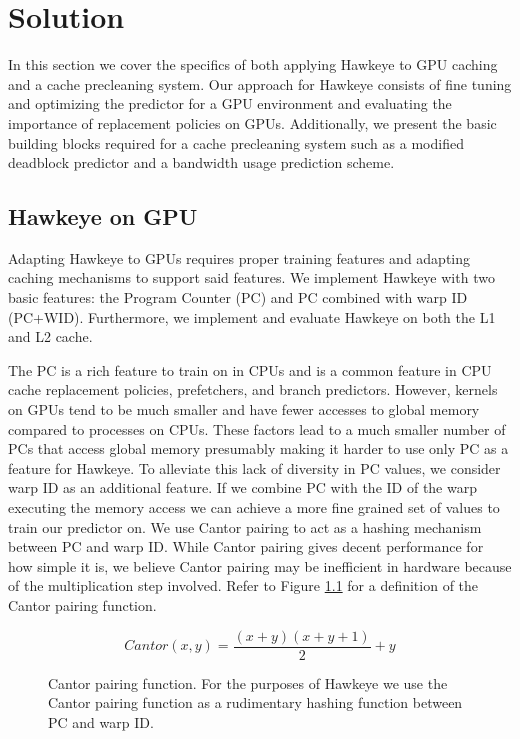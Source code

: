 \chapter{Solution}

In this section we cover the specifics of both applying Hawkeye to GPU caching and a cache precleaning system. Our approach for Hawkeye consists of fine tuning and optimizing the predictor for a GPU environment and evaluating the importance of replacement policies on GPUs. Additionally, we present the basic building blocks required for a cache precleaning system such as a modified deadblock predictor and a bandwidth usage prediction scheme.

\section{Hawkeye on GPU}
Adapting Hawkeye to GPUs requires proper training features and adapting caching mechanisms to support said features. We implement Hawkeye with two basic features: the Program Counter (PC) and PC combined with warp ID (PC+WID). Furthermore, we implement and evaluate Hawkeye on both the L1 and L2 cache.

The PC is a rich feature to train on in CPUs and is a common feature in CPU cache replacement policies, prefetchers, and branch predictors. However, kernels on GPUs tend to be much smaller and have fewer accesses to global memory compared to processes on CPUs. These factors lead to a much smaller number of PCs that access global memory presumably making it harder to use only PC as a feature for Hawkeye. To alleviate this lack of diversity in PC values, we consider warp ID as an additional feature. If we combine PC with the ID of the warp executing the memory access we can achieve a more fine grained set of values to train our predictor on. We use Cantor pairing to act as a hashing mechanism between PC and warp ID. While Cantor pairing gives decent performance for how simple it is, we believe Cantor pairing may be inefficient in hardware because of the multiplication step involved. Refer to Figure \ref{f:cantor} for a definition of the Cantor pairing function.

\begin{figure}[htb]
\begin{center}
$$
Cantor(x, y) = \frac{(x + y) (x + y + 1)}{2} + y
$$
\caption{Cantor pairing function. For the purposes of Hawkeye we use the Cantor pairing function as a rudimentary hashing function between PC and warp ID.}
\label{f:cantor}
\end{center}
\end{figure}

